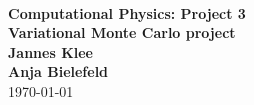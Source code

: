 \begin{titlepage}
\\

    \vspace{3.5cm}
    \center
    {\hspace{5mm}\Large\bf Computational Physics: Project 3}\\
    \vspace{1.5cm}
    {\hspace{5mm}\huge\textbf{Variational Monte Carlo project}}\\
    \vspace{4cm}
    {\hspace{5mm}\Large\bf Jannes Klee}\\
    \vspace{1cm}
    {\hspace{5mm}\Large\bf Anja Bielefeld}\\
    \vspace{1.5cm}
    {\hspace{5mm}\large \today}\\
    \vspace{1.5cm}
\end{titlepage}
\tableofcontents
